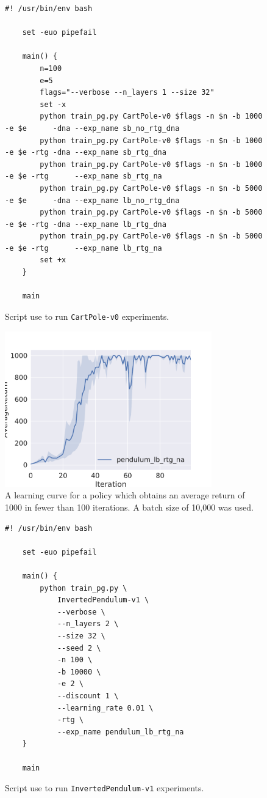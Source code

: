 \begin{figure}
  \centering
  \scriptsize
  \begin{Verbatim}[gobble=4]
    #! /usr/bin/env bash

    set -euo pipefail

    main() {
        n=100
        e=5
        flags="--verbose --n_layers 1 --size 32"
        set -x
        python train_pg.py CartPole-v0 $flags -n $n -b 1000 -e $e      -dna --exp_name sb_no_rtg_dna
        python train_pg.py CartPole-v0 $flags -n $n -b 1000 -e $e -rtg -dna --exp_name sb_rtg_dna
        python train_pg.py CartPole-v0 $flags -n $n -b 1000 -e $e -rtg      --exp_name sb_rtg_na
        python train_pg.py CartPole-v0 $flags -n $n -b 5000 -e $e      -dna --exp_name lb_no_rtg_dna
        python train_pg.py CartPole-v0 $flags -n $n -b 5000 -e $e -rtg -dna --exp_name lb_rtg_dna
        python train_pg.py CartPole-v0 $flags -n $n -b 5000 -e $e -rtg      --exp_name lb_rtg_na
        set +x
    }

    main
  \end{Verbatim}
  \caption{Script use to run \texttt{CartPole-v0} experiments.}
  \label{fig:cartpole-script}
\end{figure}

\begin{figure}[h]
  \centering
  \includegraphics[width=0.8\textwidth]{pendulum.pdf}
  \caption{%
    A learning curve for a policy which obtains an average return of 1000 in
    fewer than 100 iterations. A batch size of 10,000 was used.
  }
  \label{fig:pendulum}
\end{figure}

\begin{figure}
  \centering
  \footnotesize
  \begin{Verbatim}[gobble=4]
    #! /usr/bin/env bash

    set -euo pipefail

    main() {
        python train_pg.py \
            InvertedPendulum-v1 \
            --verbose \
            --n_layers 2 \
            --size 32 \
            --seed 2 \
            -n 100 \
            -b 10000 \
            -e 2 \
            --discount 1 \
            --learning_rate 0.01 \
            -rtg \
            --exp_name pendulum_lb_rtg_na
    }

    main
  \end{Verbatim}
  \caption{Script use to run \texttt{InvertedPendulum-v1} experiments.}
  \label{fig:pendulum-script}
\end{figure}
